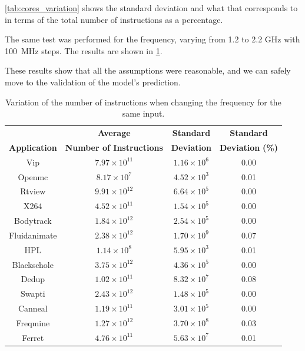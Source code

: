 \cref{tab:cores_variation} shows the standard deviation and what that corresponds to in terms of the total number of instructions as a percentage. 

The same test was performed for the frequency, varying from 1.2 to 2.2 GHz with 100~MHz steps. The results are shown in \cref{tab:freq_variation}.

These results show that all the assumptions were reasonable, and we can safely move to the validation of the model's prediction.
\begin{table}[H]
	\caption{Variation of the number of instructions when changing the frequency for the same input.}
	\centering
	\begin{tabular*}{\hsize}{@{\extracolsep{\fill}}cccc}
		\toprule
		& \textbf{Average} & \textbf{Standard}     & \textbf{Standard}\\
		\multirow{-2}{*}{\textbf{Application}}& \textbf{Number of Instructions} & \textbf{Deviation}     & \textbf{Deviation} \textbf{(\%)} \\ \midrule
		Vip          & $7.97 \times 10^{11}$      & $ 1.16 \times 10^{6}$  & 0.00      \\ 
		Openmc       & $8.17 \times 10^{7}$       & $ 4.52 \times 10^{3}$  & 0.01      \\ 
		Rtview       & $9.91 \times 10^{12}$      & $ 6.64 \times 10^{5}$  & 0.00      \\ 
		X264         & $4.52 \times 10^{11}$      & $ 1.54 \times 10^{5}$  & 0.00      \\ 
		Bodytrack    & $1.84 \times 10^{12}$      & $ 2.54 \times 10^{5}$  & 0.00      \\ 
		Fluidanimate & $2.38 \times 10^{12}$      & $ 1.70 \times 10^{9}$  & 0.07      \\ 
		HPL          & $1.14 \times 10^{8}$       & $ 5.95 \times 10^{3}$  & 0.01      \\ 
		Blackschole  & $3.75 \times 10^{12}$      & $ 4.36 \times 10^{5}$  & 0.00      \\ 
		Dedup        & $1.02 \times 10^{11}$      & $ 8.32 \times 10^{7}$  & 0.08      \\ 
		Swapti       & $2.43 \times 10^{12}$      & $ 1.48 \times 10^{5}$  & 0.00      \\ 
		Canneal      & $1.19 \times 10^{11}$      & $ 3.01 \times 10^{5}$  & 0.00      \\ 
		Freqmine     & $1.27 \times 10^{12}$      & $ 3.70 \times 10^{8}$  & 0.03      \\ 
		Ferret       & $4.76 \times 10^{11}$      & $ 5.63 \times 10^{7}$  & 0.01      \\\bottomrule
	\end{tabular*}
	\label{tab:freq_variation}
\end{table}


